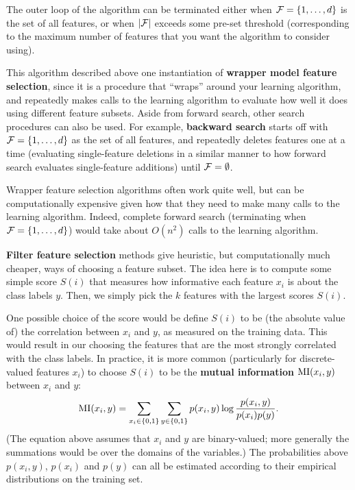 \documentclass{article}
\begin{document}
The outer loop of the algorithm can be terminated either 
when ${\cal F} = \{1, \ldots, {d}\}$ is 
the set of all features, or when $|{\cal F}|$ exceeds some pre-set threshold
(corresponding to the maximum number of features that you want the algorithm
to consider using).

This algorithm described above one instantiation of 
{\bf wrapper model feature selection}, since it is a 
procedure that ``wraps'' around your learning algorithm, 
and repeatedly makes calls to the learning algorithm to evaluate how
well it does using different feature subsets.  Aside from forward
search, other search procedures can also be used. 
For example, {\bf backward search}
starts off with ${\cal F} = \{1, \ldots, {d}\}$ as the set of all features,
and repeatedly deletes features one at a time (evaluating single-feature
deletions in a similar manner to how forward search evaluates single-feature 
additions) until ${\cal F} = \emptyset$.

Wrapper feature selection algorithms often work quite well, but can 
be computationally expensive given how that they need to make 
many calls to the learning algorithm. Indeed, complete forward 
search (terminating when ${\cal F} = \{1,\ldots,{d}\}$)
would take about $O(n^2)$ calls to the learning algorithm. 

{\bf Filter feature selection} methods give heuristic, but computationally
much cheaper, ways of choosing a feature subset. 
The idea here is to compute some 
simple score $S(i)$ that measures how informative each 
feature $x_i$ is about the class labels $y$.  Then, we simply pick the
$k$ features with the largest scores $S(i)$.  

One possible choice of the score would be define $S(i)$ to be (the
absolute value of) the correlation between $x_i$ and $y$, as measured on the training 
data.  This would result in our choosing the features that are the most 
strongly correlated with the class labels.  In practice, it is more common 
(particularly for discrete-valued features $x_i$)
to choose $S(i)$ to be the {\bf mutual information} ${\rm MI}(x_i, y)$ between
$x_i$ and $y$:
\[
{\rm MI}(x_i,y) = \sum_{x_i \in \{0,1\}} \sum_{y \in \{0,1\}} p(x_i, y) \log \frac{p(x_i,y)}{p(x_i)p(y)}. 
\]
(The equation above assumes that $x_i$ and $y$ are binary-valued; more generally 
the summations would be over the domains of the variables.)  The probabilities above 
$p(x_i, y)$, $p(x_i)$ and $p(y)$ can all be estimated according to their 
empirical distributions on the training set. 
\end{document}
